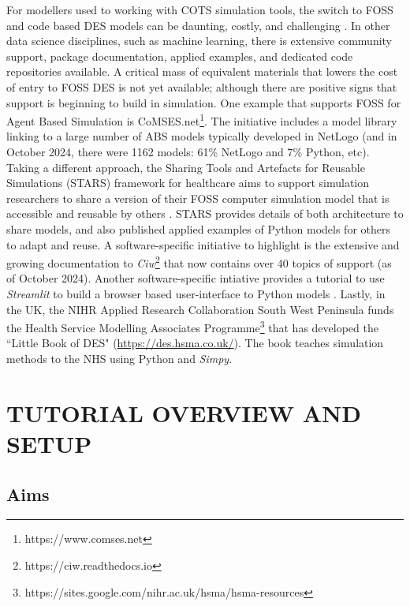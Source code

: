 \documentclass{swpaperproc}
\theoremstyle{sw}
\begin{document}
For modellers used to working with COTS simulation tools, the switch to FOSS and code based DES models can be daunting, costly, and challenging \cite{monks_harper_2023}. In other data science disciplines, such as machine learning, there is extensive community support, package documentation, applied examples, and dedicated code repositories available.  A critical mass of equivalent materials that lowers the cost of entry to FOSS DES is not yet available; although there are positive signs that support is beginning to build in simulation.  One example that supports FOSS for Agent Based Simulation is CoMSES.net\footnote{https://www.comses.net}. The initiative includes a model library linking to a large number of ABS models typically developed in NetLogo (and in October 2024, there were 1162 models: 61\% NetLogo and 7\% Python, etc).  Taking a different approach, the Sharing Tools and Artefacts for Reusable Simulations (STARS) framework for healthcare aims to support simulation researchers to share a version of their FOSS computer simulation model that is accessible and reusable by others \cite{starstowardspaper}. STARS provides details of both architecture to share models, and also published applied examples of Python models for others to adapt and reuse.  A software-specific initiative to highlight is the extensive and growing documentation to \textit{Ciw}\footnote{https://ciw.readthedocs.io} that now contains over 40 topics of support (as of October 2024). Another software-specific intiative provides a tutorial to use \textit{Streamlit} to build a browser based user-interface to Python models \cite{monks2023improving}. Lastly, in the UK, the NIHR Applied Research Collaboration South West Peninsula funds the Health Service Modelling Associates Programme\footnote{https://sites.google.com/nihr.ac.uk/hsma/hsma-resources} that has developed the ``Little Book of DES" (\url{https://des.hsma.co.uk/}). The book teaches simulation methods to the NHS using Python and \textit{Simpy}.


\section{TUTORIAL OVERVIEW AND SETUP}

\subsection{Aims}
\end{document}
